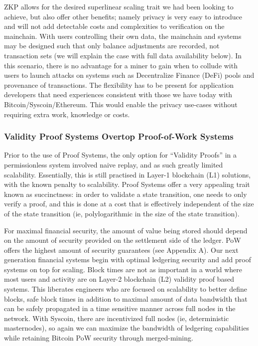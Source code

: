 \documentclass[peerreview]{ieeesyscoin}
\begin{document}
ZKP allows for the desired superlinear scaling trait we had been looking to achieve, but also offer other benefits; namely privacy is very easy to introduce and will not add detectable costs and complexities to verification on the mainchain. With users controlling their own data, the mainchain and systems may be designed such that only balance adjustments are recorded, not transaction sets (we will explain the case with full data availability below). In this scenario, there is no advantage for a miner to gain when to collude with users to launch attacks on systems such as Decentralize Finance (DeFi) pools and provenance of transactions. The flexibility has to be present for application developers that need experiences consistent with those we have today with Bitcoin/Syscoin/Ethereum. This would enable the privacy use-cases without requiring extra work, knowledge or costs.


\subsubsection{Validity Proof Systems Overtop Proof-of-Work Systems}

Prior to the use of Proof Systems, the only option for “Validity Proofs” in a permissionless system involved naive replay, and as such greatly limited scalability. Essentially, this is still practised in Layer-1 blockchain (L1) solutions, with the known penalty to scalability. Proof Systems offer a very appealing trait known as succinctness: in order to validate a state transition, one needs to only verify a proof, and this is done at a cost that is effectively independent of the size of the state transition (ie, polylogarithmic in the size of the state transition).

For maximal financial security, the amount of value being stored should depend on the amount of security provided on the settlement side of the ledger. PoW offers the highest amount of security guarantees (see Appendix A). Our next generation financial systems begin with optimal ledgering security and add proof systems on top for scaling. Block times are not as important in a world where most users and activity are on Layer-2 blockchain (L2) validity proof based systems. This liberates engineers who are focused on scalability to better define blocks, safe block times in addition to  maximal amount of data bandwidth that can be safely propagated in a time sensitive manner across full nodes in the network. With Syscoin, there are incentivized full nodes (ie, deterministic masternodes), so again we can maximize the bandwidth of ledgering capabilities while retaining Bitcoin PoW security through merged-mining.
\end{document}
